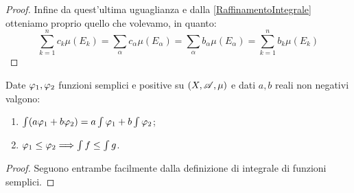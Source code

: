 \begin{proof}
	Infine da quest'ultima uguaglianza e dalla \cref{RaffinamentoIntegrale} otteniamo proprio quello che volevamo, in quanto:
	\begin{equation*}
		\sum_{k=1}^n c_k \mu(E_k)=\sum_\alpha c_\alpha\mu(E_\alpha)=\sum_\alpha b_\alpha\mu(E_\alpha)=\sum_{k=1}^n b_k \mu(E_k)
	\end{equation*}
\end{proof}

\begin{proposition}\label{PropIntSemp}
	Date $\varphi_1,\varphi_2$ funzioni semplici e positive su $(X,\mathscr A,\mu)$ e dati $a,b$ reali non negativi valgono:
	\begin{enumerate}
		\item $\int (a\varphi_1+b\varphi_2)=a\int \varphi_1+b\int \varphi_2$; \label{PIS:add}
		\item $\varphi_1\le \varphi_2\Longrightarrow \int f\le \int g$. \label{PIS:mono}
	\end{enumerate}
\end{proposition}
\begin{proof}
	Seguono entrambe facilmente dalla definizione di integrale di funzioni semplici.
\end{proof}




